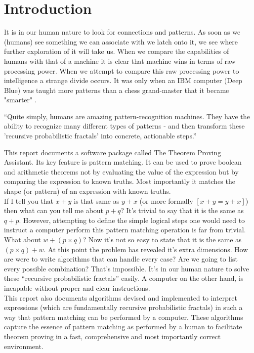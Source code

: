 \documentclass{article}
\newcommand{\enterProblemHeader}[1]{
\nobreak\extramarks{#1}{#1}\nobreak
\nobreak\extramarks{#1}{#1}\nobreak
}
\newcommand{\exitProblemHeader}[1]{
\nobreak\extramarks{#1}{#1 continued on next page\ldots}\nobreak
\nobreak\extramarks{#1}{}\nobreak
}
\newcounter{homeworkProblemCounter} %
\newcommand{\homeworkProblemName}{}
\newenvironment{homeworkProblem}[1][
 \arabic{homeworkProblemCounter}]{ %
\stepcounter{homeworkProblemCounter} %
\renewcommand{\homeworkProblemName}{#1} %
\section{\homeworkProblemName} %
\enterProblemHeader{} %
}{
\exitProblemHeader{} %
}
\begin{document}
\begin{homeworkProblem}[Introduction]

It is in our human nature to look for connections and patterns. As soon as we (humans) see something we can associate with we latch onto it, we see where further exploration of it will take us. When we compare the capabilities of humans with that of a machine it is clear that machine wins in terms of raw processing power. When we attempt to compare this raw processing power to intelligence a strange divide occurs. It was only when an IBM computer (Deep Blue) was taught more patterns than a chess grand-master that it became "smarter" \cite{DEEPBLUE:1997}.

\begin{displayquote}
``Quite simply, humans are amazing pattern-recognition machines. They have the ability to recognize many different types of patterns - and then transform these  'recursive probabilistic fractals' into concrete, actionable steps.''\cite{PROBFRACT}
\end{displayquote}

This report documents a software package called The Theorem Proving Assistant. Its key feature is pattern matching. It can be used to prove boolean and arithmetic theorems not by evaluating the value of the expression but by comparing the expression to known truths. Most importantly it matches the shape (or pattern) of an expression with known truths.\\

If I tell you that $x+y$ is that same as $y+x$ (or more formally $[x + y = y + x]$) then what can you tell me about $p + q$? It's trivial to say that it is the same as $q + p$. However, attempting to define the simple logical steps one would need to instruct a computer perform this pattern matching operation is far from trivial. What about $w+(p \times q)$? Now it's not so easy to state that it is the same as $(p \times q)+w$. At this point the problem has revealed it's extra dimensions. How are were to write algorithms that can handle every case? Are we going to list every possible combination? That's impossible. It's in our human nature to solve these ``recursive probabilistic fractals'' easily. A computer on the other hand, is incapable without proper and clear instructions.\\

This report also documents algorithms devised and implemented to interpret  expressions (which are fundamentally recursive probabilistic fractals) in such a way that pattern matching can be performed by a computer. These algorithms capture the essence of pattern matching as performed by a human to facilitate theorem proving in a fast, comprehensive and most importantly correct environment.

\newpage
\end{homeworkProblem}
\end{document}

